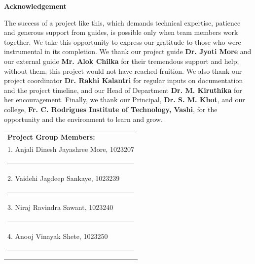 
\begin{centering}
{\LARGE\bfseries Acknowledgement}\\
\end{centering}

\vspace{0.5cm}
\justify
The success of a project like this, which demands technical expertise, patience and generous support from guides, is possible only when team members work together. We take this opportunity to express our gratitude to those who were instrumental in its completion. We thank our project guide \textbf{Dr. Jyoti More} and our external guide \textbf{Mr. Alok Chilka} for their tremendous support and help; without them, this project would not have reached fruition. We also thank our project coordinator \textbf{Dr. Rakhi Kalantri} for regular inputs on documentation and the project timeline, and our Head of Department \textbf{Dr. M. Kiruthika} for her encouragement. Finally, we thank our Principal, \textbf{Dr. S. M. Khot}, and our college, \textbf{Fr. C. Rodrigues Institute of Technology, Vashi}, for the opportunity and the environment to learn and grow.

\vspace{3cm}
\hfill
\begin{tabular}[t]{l@{}}
\textbf{Project Group Members:} \\[1cm]
1. Anjali Dinesh Jayashree More, 1023207 \\[0.9cm]
\rule{5cm}{0.4pt} \\[0.8cm]
2. Vaidehi Jagdeep Sankaye, 1023239 \\[0.9cm]
\rule{5cm}{0.4pt} \\[0.8cm]
3. Niraj Ravindra Sawant, 1023240 \\[0.9cm]
\rule{5cm}{0.4pt} \\[0.8cm]
4. Anooj Vinayak Shete, 1023250 \\[0.9cm]
\rule{5cm}{0.4pt}
\end{tabular}
